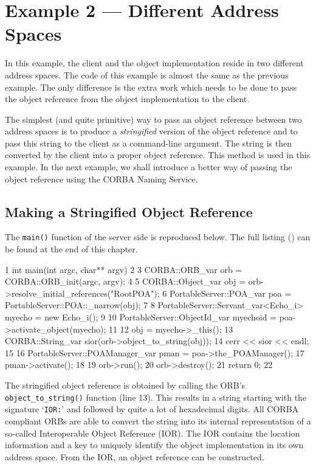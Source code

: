 \documentclass[11pt,twoside,a4paper]{book}
\newcommand{\code}[1]{\texttt{#1}}
\newcommand{\op}[1]{\texttt{#1()}}
\newcommand{\term}[1]{\textit{#1}}
\newcommand{\file}{\begingroup \urlstyle{tt}\Url}
\newcommand{\dsc}{\discretionary{}{}{}}
\begin{document}
\section{Example 2 --- Different Address Spaces}

In this example, the client and the object implementation reside in
two different address spaces. The code of this example is almost the
same as the previous example. The only difference is the extra work
which needs to be done to pass the object reference from the object
implementation to the client.

The simplest (and quite primitive) way to pass an object reference
between two address spaces is to produce a \term{stringified} version
of the object reference and to pass this string to the client as a
command-line argument.  The string is then converted by the client
into a proper object reference.  This method is used in this
example. In the next example, we shall introduce a better way of
passing the object reference using the CORBA Naming Service.

\subsection{Making a Stringified Object Reference}

The \op{main} function of the server side is reproduced below. The
full listing (\file{eg2_impl.cc}) can be found at the end of this
chapter.

\lstset{numbers=left,gobble=4}
\begin{cxxlisting}
 1  int main(int argc, char** argv)
 2  {
 3    CORBA::ORB_var orb = CORBA::ORB_init(argc, argv);
 4
 5    CORBA::Object_var       obj = orb->resolve_initial_references("RootPOA");
 6    PortableServer::POA_var poa = PortableServer::POA::_narrow(obj);
 7
 8    PortableServer::Servant_var<Echo_i> myecho = new Echo_i();
 9
10    PortableServer::ObjectId_var myechoid = poa->activate_object(myecho);
11
12    obj = myecho->_this();
13    CORBA::String_var sior(orb->object_to_string(obj));
14    cerr << sior << endl;
15
16    PortableServer::POAManager_var pman = poa->the_POAManager();
17    pman->activate();
18
19    orb->run();
20    orb->destroy();
21    return 0;
22  }
\end{cxxlisting}
\lstset{numbers=none,gobble=0}

The stringified object reference is obtained by calling the ORB's
\op{object\_to\_\dsc{}string} function (line 13). This results in a
string starting with the signature `\code{IOR:}' and followed by quite
a lot of hexadecimal digits. All CORBA compliant ORBs are able to
convert the string into its internal representation of a so-called
Interoperable Object Reference (IOR). The IOR contains the location
information and a key to uniquely identify the object implementation
in its own address space. From the IOR, an object reference can be
constructed.
\end{document}
